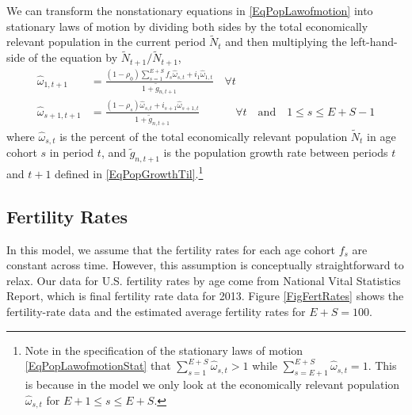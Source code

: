 \documentclass[letterpaper,12pt]{article}
\theoremstyle{definition}
\begin{document}
    We can transform the nonstationary equations in \eqref{EqPopLawofmotion} into stationary laws of motion by dividing both sides by the total economically relevant population in the current period $\tilde{N}_t$ and then multiplying the left-hand-side of the equation by $\tilde{N}_{t+1}/\tilde{N}_{t+1}$,
    \begin{equation}\label{EqPopLawofmotionStat}
      \begin{split}
        \hat{\omega}_{1,t+1} &= \frac{(1-\rho_0)\sum_{s=1}^{E+S} f_s\hat{\omega}_{s,t} + i_1\hat{\omega}_{1,t}}{1+\tilde{g}_{n,t+1}}\quad\forall t \\
        \hat{\omega}_{s+1,t+1} &= \frac{(1 - \rho_s)\hat{\omega}_{s,t} + i_{s+1}\hat{\omega}_{s+1,t}}{1+\tilde{g}_{n,t+1}}\qquad\quad\:\forall t\quad\text{and}\quad 1\leq s \leq E+S-1
      \end{split}
    \end{equation}
    where $\hat{\omega}_{s,t}$ is the percent of the total economically relevant population $\tilde{N}_t$ in age cohort $s$ in period $t$, and $\tilde{g}_{n,t+1}$ is the population growth rate between periods $t$ and $t+1$ defined in \eqref{EqPopGrowthTil}.\footnote{Note in the specification of the stationary laws of motion \eqref{EqPopLawofmotionStat} that $\sum_{s=1}^{E+S}\hat{\omega}_{s,t}>1$ while $\sum_{s=E+1}^{E+S}\hat{\omega}_{s,t}=1$. This is because in the model we only look at the economically relevant population $\hat{\omega}_{s,t}$ for $E+1\leq s\leq E+S$.}


  \subsection{Fertility Rates}\label{AppPopFert}

    In this model, we assume that the fertility rates for each age cohort $f_s$ are constant across time. However, this assumption is conceptually straightforward to relax. Our data for U.S. fertility rates by age come from \citet[Table 3, p. 18]{MartinEtAl:2015} National Vital Statistics Report, which is final fertility rate data for 2013. Figure \ref{FigFertRates} shows the fertility-rate data and the estimated average fertility rates for $E+S=100$.
\end{document}
